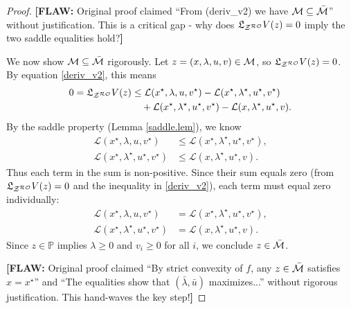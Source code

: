 \documentclass[journal,twoside,web]{ieeecolor}
\newcommand{\flaw}[1]{\textcolor{reviewerred}{\textbf{[FLAW: }#1\textbf{]}}}
\begin{document}
\begin{proof}
\flaw{Original proof claimed ``From (deriv\_v2) we have ${\cal M}\subseteq \bar{\cal M}$'' without justification. This is a critical gap - why does $\mathfrak{L}_{{\cal Z}^{\cal RO}}V(z) = 0$ imply the two saddle equalities hold?}

{\color{proofpurple}We now show ${\cal M}\subseteq \bar{\cal M}$ rigorously. Let $z = (x, \lambda, u, v) \in {\cal M}$, so $\mathfrak{L}_{{\cal Z}^{\cal RO}}V(z) = 0$. By equation \eqref{deriv_v2}, this means
\begin{align*}
0 = \mathfrak{L}_{{\cal Z}^{\cal RO}}V(z) &\leq \mathcal{L}(x^\star,\lambda,u,v^\star)-\mathcal{L}(x^\star,\lambda^\star,u^\star,v^\star)\\
&\quad +\mathcal{L}(x^\star,\lambda^\star,u^\star,v^\star)-\mathcal{L}(x,\lambda^\star,u^\star,v).
\end{align*}
By the saddle property (Lemma \ref{saddle.lem}), we know
\begin{align*}
\mathcal{L}(x^\star,\lambda,u,v^\star) &\leq \mathcal{L}(x^\star,\lambda^\star,u^\star,v^\star),\\
\mathcal{L}(x^\star,\lambda^\star,u^\star,v^\star) &\leq \mathcal{L}(x,\lambda^\star,u^\star,v).
\end{align*}
Thus each term in the sum is non-positive. Since their sum equals zero (from $\mathfrak{L}_{{\cal Z}^{\cal RO}}V(z) = 0$ and the inequality in \eqref{deriv_v2}), each term must equal zero individually:
\begin{align*}
\mathcal{L}(x^\star,\lambda,u,v^\star) &= \mathcal{L}(x^\star,\lambda^\star,u^\star,v^\star),\\
\mathcal{L}(x^\star,\lambda^\star,u^\star,v^\star) &= \mathcal{L}(x,\lambda^\star,u^\star,v).
\end{align*}
Since $z \in \mathbb{P}$ implies $\lambda \geq 0$ and $v_i \geq 0$ for all $i$, we conclude $z \in \bar{\cal M}$.}

\medskip
\flaw{Original proof claimed ``By strict convexity of $f$, any $z\in\bar{\cal M}$ satisfies $x=x^\star$'' and ``The equalities show that $(\bar\lambda,\bar u)$ maximizes...'' without rigorous justification. This hand-waves the key step!}


\end{proof}
\end{document}
